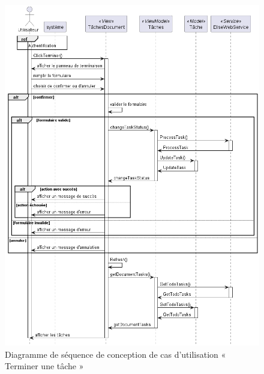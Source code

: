 \begin{figure}[H]
  \centering
  \includegraphics[width=1\textwidth]{out/diagrams/documents/sequence_terminer_task/sequence_terminer_task}
  \caption{Diagramme de séquence de conception de cas d'utilisation « Terminer une tâche »}
  \label{fig:sequence_conception_terminerTask}
\end{figure}
